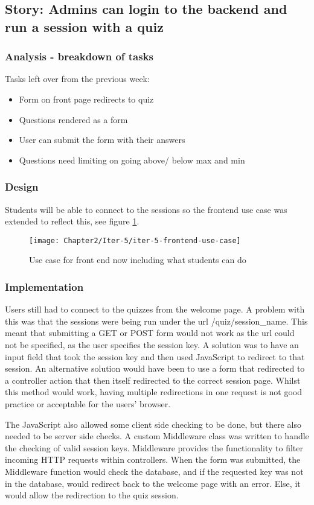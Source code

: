 \subsection{Story: Admins can login to the backend and run a session with a quiz}
\subsubsection{Analysis - breakdown of tasks}
Tasks left over from the previous week:
\begin{itemize}
	\item Form on front page redirects to quiz
	\item Questions rendered as a form
	\item User can submit the form with their answers
	\item Questions need limiting on going above/ below max and min
\end{itemize}
\subsubsection{Design}
Students will be able to connect to the sessions so the frontend use case was extended to reflect this, see figure \ref{fig:iter-5-frontend-use-case}.

\begin{figure}
	\caption{Use case for front end now including what students can do}
	\centerline{\texttt{[image: Chapter2/Iter-5/iter-5-frontend-use-case]}}
	\label{fig:iter-5-frontend-use-case}
\end{figure}

\subsubsection{Implementation}
Users still had to connect to the quizzes from the welcome page. A problem with this was that the sessions were being run under the url /quiz/session\_name. This meant that submitting a GET or POST form would not work as the url could not be specified, as the user specifies the session key. A solution was to have an input field that took the session key and then used JavaScript to redirect to that session. An alternative solution would have been to use a form that redirected to a controller action that then itself redirected to the correct session page. Whilst this method would work, having multiple redirections in one request is not good practice or acceptable for the users' browser.

The JavaScript also allowed some client side checking to be done, but there also needed to be server side checks. A custom Middleware class was written to handle the checking of valid session keys. Middleware provides the functionality to filter incoming HTTP requests within controllers\cite{laravel-middleware}. When the form was submitted, the Middleware function would check the database, and if the requested key was not in the database, would redirect back to the welcome page with an error. Else, it would allow the redirection to the quiz session.

